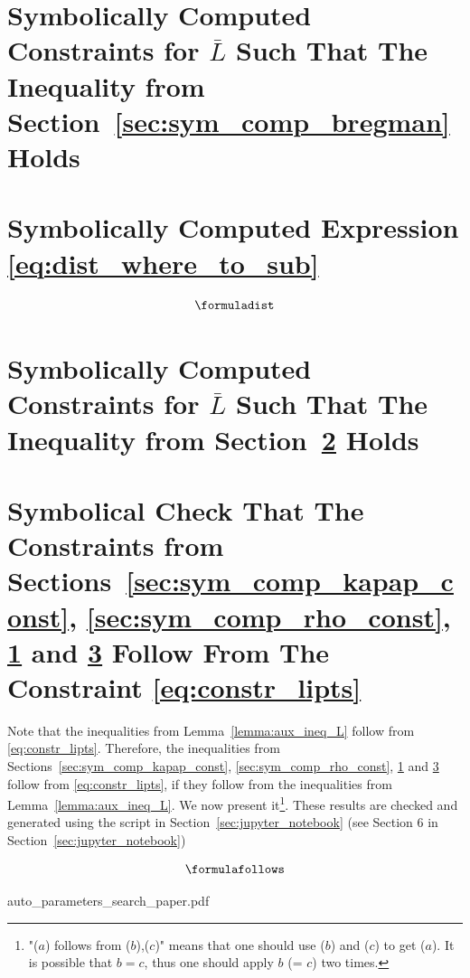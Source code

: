 \documentclass{article} %
\theoremstyle{plain}
\theoremstyle{definition}
\theoremstyle{remark}
\begin{document}
\section{Symbolically Computed Constraints for $\bar{L}$ Such That The Inequality from Section~\ref{sec:sym_comp_bregman} Holds}
\label{sec:sym_comp_bregman_const}
  \formulabregmanconst

\section{Symbolically Computed Expression \eqref{eq:dist_where_to_sub}}
\label{sec:sym_comp_dist}
\begin{align*}
  \formuladist
\end{align*}

\section{Symbolically Computed Constraints for $\bar{L}$ Such That The Inequality from Section~\ref{sec:sym_comp_dist} Holds}
\label{sec:sym_comp_dist_const}
  \formuladistconst

\section{Symbolical Check That The Constraints from Sections~\ref{sec:sym_comp_kapap_const}, \ref{sec:sym_comp_rho_const}, \ref{sec:sym_comp_bregman_const} and \ref{sec:sym_comp_dist_const} Follow From The Constraint \eqref{eq:constr_lipts}}
\label{sec:sym_comp_check}

Note that the inequalities from Lemma~\ref{lemma:aux_ineq_L} follow from \eqref{eq:constr_lipts}. Therefore, the inequalities from Sections~\ref{sec:sym_comp_kapap_const}, \ref{sec:sym_comp_rho_const}, \ref{sec:sym_comp_bregman_const} and \ref{sec:sym_comp_dist_const} follow from \eqref{eq:constr_lipts}, if they follow from the inequalities from Lemma~\ref{lemma:aux_ineq_L}. We now present it\footnote{"($a$) follows from ($b$),($c$)" means that one should use ($b$) and ($c$) to get ($a$). It is possible that $b = c$, thus one should apply $b$ (= $c$) two times.}. These results are checked and generated using the script in Section~\ref{sec:jupyter_notebook} (see Section 6 in Section~\ref{sec:jupyter_notebook})

\begin{align*}
  \formulafollows
\end{align*}


{auto_parameters_search_paper.pdf}
\end{document}
